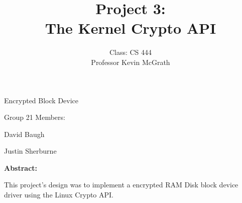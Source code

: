 \documentclass[10pt,drafclsnofoot,onecolumn]{IEEEtran}
\begin{document}
               
\begin{titlepage}
\title{\huge{Project 3:} \\ \large{The Kernel Crypto API}}
\author{
	Class: CS 444 \\ Professor Kevin McGrath
}

\null  %
\nointerlineskip  %
\vfill
\let\snewpage \newpage
\let\newpage \relax
\maketitle
\begin{center}
\huge{Encrypted Block Device}\par
\vspace{2mm}
\large{Group 21 Members:}\par
\normalsize{David Baugh}\par
\normalsize{Justin Sherburne}\par
\vspace{8mm}
\large{\textbf{Abstract:}}\par 
\vspace{2mm}
\normalsize{This project's design was to implement a encrypted RAM Disk block device driver using the Linux Crypto API.}
\end{center}
\let \newpage \snewpage
\vfill 
\break %
\end{titlepage}
\end{document}
